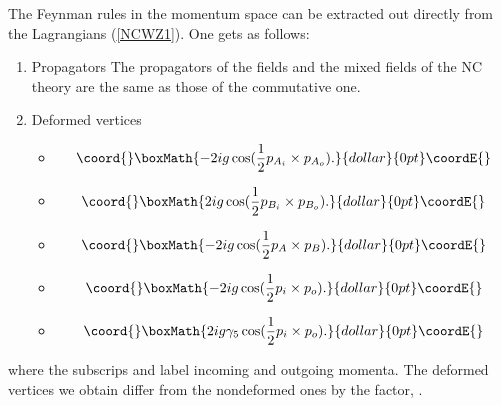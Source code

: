 \documentclass[a4paper,a4paper]{article}
\begin{document}
The Feynman rules in the momentum space can be extracted 
out directly from the Lagrangians (\ref{NCWZ1}). One gets as follows:
\begin{enumerate}
\item Propagators\newline 
The propagators of the fields and the mixed fields of the NC theory are 
the same as those of the commutative one.  
\item Deformed vertices
\begin{itemize}
\item  {}\coordHE{}  $$\coord{}\boxMath{-2ig\cos(\frac 12 p_{A_i}\times p_{A_o}).}{dollar}{0pt}\coordE{}$$
\item  {}\coordHE{}  $$\coord{}\boxMath{2ig\cos(\frac 12 p_{B_i}\times p_{B_o}).}{dollar}{0pt}\coordE{}$$
\item {}\coordHE{}  $$\coord{}\boxMath{-2ig\cos(\frac 12 p_{A}\times p_{B}).}{dollar}{0pt}\coordE{}$$
\item {}\coordHE{}  $$\coord{}\boxMath{-2ig\cos(\frac 12 p_i\times p_o).}{dollar}{0pt}\coordE{}$$
\item {}\coordHE{}  $$\coord{}\boxMath{2ig\gamma_5\cos(\frac 12 p_i\times p_o).}{dollar}{0pt}\coordE{}$$
\end{itemize}
\end{enumerate}
where the subscrips \coordHE{} and \coordHE{} label incoming and outgoing momenta.
The deformed vertices we obtain differ from the nondeformed ones by the factor, 
\coordHE{}. 
\end{document}
